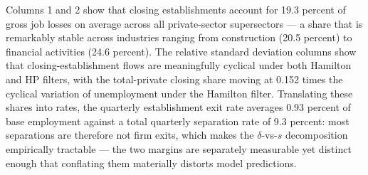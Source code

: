 \documentclass[authoryear, review, 12pt]{elsarticle}
\begin{document}
	Columns 1 and 2 show that closing establishments account for 19.3 percent of gross job losses on average across all private-sector supersectors 
	--- a share that is remarkably stable across industries ranging from construction (20.5 percent) to financial activities (24.6 percent). The relative standard deviation columns show that closing-establishment 
	flows are meaningfully cyclical under both Hamilton and HP filters, with the total-private closing share moving at 0.152 times the 
	cyclical variation of unemployment under the Hamilton filter. 
	Translating these shares into rates, the quarterly establishment 
	exit rate averages 0.93 percent of base employment against a total 
	quarterly separation rate of 9.3 percent: most separations are 
	therefore not firm exits, which makes the $\delta$-vs-$s$ 
	decomposition empirically tractable --- the two margins are 
	separately measurable yet distinct enough that conflating them 
	materially distorts model predictions.
\end{document}
